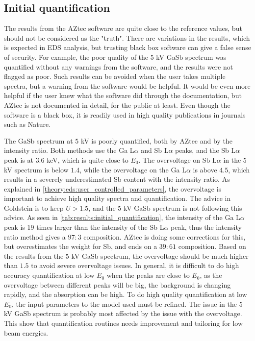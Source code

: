 \subsection{Initial quantification}
\label{discussion:quantitative:initial_quantification}


The results from the AZtec software are quite close to the reference values, but should not be considered as the "truth".
There are variations in the results, which is expected in EDS analysis, but trusting black box software can give a false sense of security.
For example, the poor quality of the $5$ kV GaSb spectrum was quantified without any warnings from the software, and the results were not flagged as poor.
Such results can be avoided when the user takes multiple spectra, but a warning from the software would be helpful.
It would be even more helpful if the user knew what the software did through the documentation, but AZtec is not documented in detail, for the public at least.
Even though the software is a black box, it is readily used in high quality publications in journals such as Nature\cite{aztec_nature_2019}.


The GaSb spectrum at $5$ kV is poorly quantified, both by AZtec and by the intensity ratio.
Both methods use the Ga L$\alpha$ and Sb L$\alpha$ peaks, and the Sb L$\alpha$ peak is at $3.6$ keV, which is quite close to $E_0$.
The overvoltage on Sb L$\alpha$ in the $5$ kV spectrum is below $1.4$, while the overvoltage on the Ga L$\alpha$ is above $4.5$, which results in a severely underestimated Sb content with the intensity ratio.
As explained in \cref{theory:eds:user_controlled_parameters}, the overvoltage is important to achieve high quality spectra and quantification.
The advice in Goldstein is to keep $U > 1.5$, and the $5$ kV GaSb spectrum is not following this advice.
As seen in \cref{tab:results:initial_quantification}, the intensity of the Ga L$\alpha$ peak is $19$ times larger than the intensity of the Sb L$\alpha$ peak, thus the intensity ratio method gives a $97:3$ composition.
AZtec is doing some corrections for this, but overestimates the weight for Sb, and ends on a $39:61$ composition.
Based on the results from the $5$ kV GaSb spectrum, the overvoltage should be much higher than $1.5$ to avoid severe overvoltage issues.
In general, it is difficult to do high accuracy quantification at low $E_0$ when the peaks are close to $E_0$, as the overvoltage between different peaks will be big, the background is changing rapidly, and the absorption can be high.
To do high quality quantification at low $E_0$, the input parameters to the model used must be refined.
The issue in the $5$ kV GaSb spectrum is probably most affected by the issue with the overvoltage.
This show that quantification routines needs improvement and tailoring for low beam energies.



